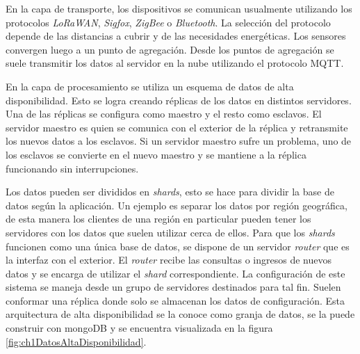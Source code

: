 En la capa de transporte, los dispositivos se comunican usualmente utilizando los protocolos \emph{LoRaWAN}, \emph{Sigfox}, \emph{ZigBee} o \emph{Bluetooth}.
La selección del protocolo depende de las distancias a cubrir y de las necesidades energéticas.
Los sensores convergen luego a un punto de agregación.
Desde los puntos de agregación se suele transmitir los datos al servidor en la nube utilizando el protocolo MQTT.

En la capa de procesamiento se utiliza un esquema de datos de alta disponibilidad.
Esto se logra creando réplicas de los datos en distintos servidores.
Una de las réplicas se configura como maestro y el resto como esclavos.
El servidor maestro es quien se comunica con el exterior de la réplica y retransmite los nuevos datos a los esclavos.
Si un servidor maestro sufre un problema, uno de los esclavos se convierte en el nuevo maestro y se mantiene a la réplica funcionando sin interrupciones.

Los datos pueden ser divididos en \emph{shards}, esto se hace para dividir la base de datos según la aplicación.
Un ejemplo es separar los datos por región geográfica, de esta manera los clientes de una región en particular pueden tener los servidores con los datos que suelen utilizar cerca de ellos.
Para que los \emph{shards} funcionen como una única base de datos, se dispone de un servidor \emph{router} que es la interfaz con el exterior.
El \emph{router} recibe las consultas o ingresos de nuevos datos y se encarga de utilizar el \emph{shard} correspondiente.
La configuración de este sistema se maneja desde un grupo de servidores destinados para tal fin.
Suelen conformar una réplica donde solo se almacenan los datos de configuración.
Esta arquitectura de alta disponibilidad se la conoce como granja de datos, se la puede construir con mongoDB \citep{WEBSITE:mongodbSharding} y se encuentra visualizada en la figura \ref{fig:ch1DatosAltaDisponibilidad}.

